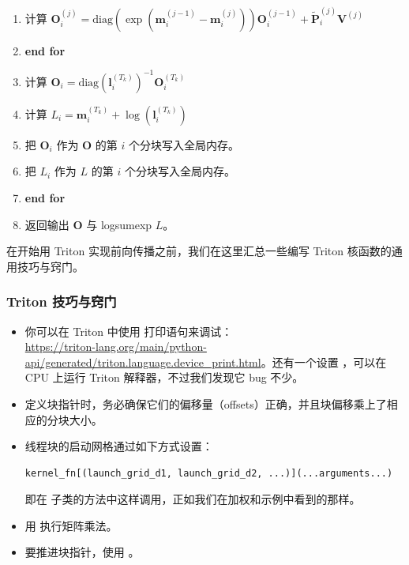 \begin{enumerate}[label=\arabic*., leftmargin=2.2em, itemsep=1pt, parsep=0pt]
  \item \hspace*{3.2em}计算 $\boldsymbol{O}_i^{(j)} = \mathrm{diag}\left(\exp\left(\boldsymbol{m}_i^{(j-1)} - \boldsymbol{m}_i^{(j)}\right)\right) \boldsymbol{O}_i^{(j-1)} + \tilde{\boldsymbol{P}}_i^{(j)} \boldsymbol{V}^{(j)}$
  \item \hspace*{1.6em}\textbf{end for}
  \item \hspace*{1.6em}计算 $\boldsymbol{O}_i = \mathrm{diag}\left(\boldsymbol{l}_i^{(T_k)}\right)^{-1} \boldsymbol{O}_i^{(T_k)}$
  \item \hspace*{1.6em}计算 $L_i = \boldsymbol{m}_i^{(T_k)} + \log\left(\boldsymbol{l}_i^{(T_k)}\right)$
  \item \hspace*{1.6em}把 $\boldsymbol{O}_i$ 作为 $\boldsymbol{O}$ 的第 $i$ 个分块写入全局内存。
  \item \hspace*{1.6em}把 $L_i$ 作为 $L$ 的第 $i$ 个分块写入全局内存。
  \item \textbf{end for}
  \item 返回输出 $\boldsymbol{O}$ 与 logsumexp $L$。
\end{enumerate}

在开始用 Triton 实现前向传播之前，我们在这里汇总一些编写 Triton 核函数的通用技巧与窍门。

\subsubsection*{Triton 技巧与窍门}

\begin{itemize}
  \item 你可以在 Triton 中使用  打印语句来调试：\\ {\footnotesize\url{https://triton-lang.org/main/python-api/generated/triton.language.device_print.html}}。还有一个设置 ，可以在 CPU 上运行 Triton 解释器，不过我们发现它 bug 不少。
  \item 定义块指针时，务必确保它们的偏移量（offsets）正确，并且块偏移乘上了相应的分块大小。
  \item 线程块的启动网格通过如下方式设置：
\begin{lstlisting}
kernel_fn[(launch_grid_d1, launch_grid_d2, ...)](...arguments...)
\end{lstlisting}
  即在  子类的方法中这样调用，正如我们在加权和示例中看到的那样。
  \item 用  执行矩阵乘法。
  \item 要推进块指针，使用 。
\end{itemize}


